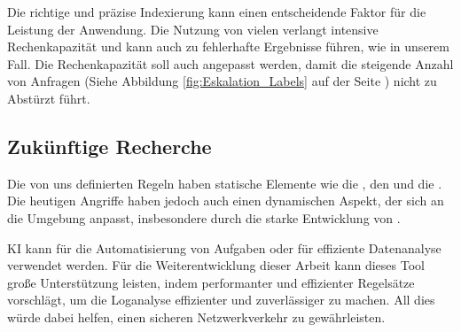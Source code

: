 Die richtige und präzise Indexierung kann einen entscheidende Faktor für die Leistung der Anwendung. Die Nutzung von vielen  verlangt intensive Rechenkapazität und kann auch zu fehlerhafte Ergebnisse führen, wie in unserem Fall. Die Rechenkapazität soll auch angepasst werden, damit die steigende Anzahl von Anfragen (Siehe Abbildung \ref{fig:Eskalation_Labels} auf der Seite \pageref{fig:Eskalation_Labels}) nicht zu Abstürzt führt.

\subsection{Zukünftige Recherche}

Die von uns definierten Regeln haben statische Elemente wie die , den  und die . Die heutigen Angriffe haben jedoch auch einen dynamischen Aspekt, der sich an die Umgebung anpasst, insbesondere durch die starke Entwicklung von  \citep{Guembe_AIHACKER}. 

\gls{KI} kann für die Automatisierung von Aufgaben oder für effiziente Datenanalyse verwendet werden. Für die Weiterentwicklung dieser Arbeit kann dieses Tool große Unterstützung leisten, indem performanter und effizienter Regelsätze vorschlägt, um die Loganalyse effizienter und zuverlässiger zu machen. All dies würde dabei helfen, einen sicheren Netzwerkverkehr zu gewährleisten.








